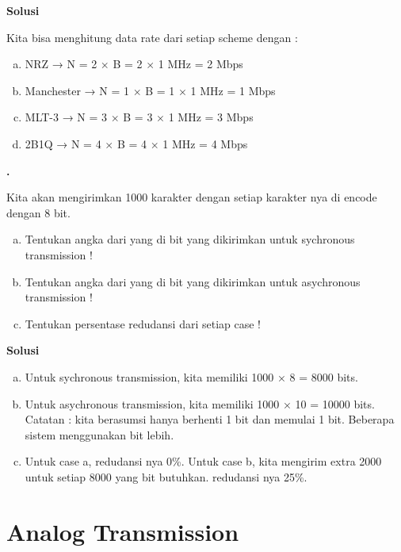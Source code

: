 \documentclass[oneside]{book}
\newcommand{\exercisename}{Latihan}
\newcommand{\solutionname}{Solusi}
\newcounter{exer}[chapter]
\renewcommand{\theexer}{\thechapter.\arabic{exer}}
\newenvironment{exercise}[1][]{
  \refstepcounter{exer}
  \par\noindent\textbf{\color{main}{\exercisename} \theexer #1 }\rmfamily}{
  \par\ignorespacesafterend}
\newenvironment{solution}{\par\noindent\textbf{\color{main}\solutionname} \em}{\par}
\begin{document}
\begin{solution}
  
  Kita bisa menghitung data rate dari setiap scheme dengan :
  \begin{enumerate}[a)]
    \item NRZ → N = 2 $\times$ B = 2 $\times$ 1 MHz = 2 Mbps
    \item Manchester → N = 1 $\times$ B = 1 $\times$ 1 MHz = 1 Mbps
    \item MLT-3 → N = 3 $\times$ B = 3 $\times$ 1 MHz = 3 Mbps
    \item 2B1Q → N = 4 $\times$ B = 4 $\times$ 1 MHz = 4 Mbps
  \end{enumerate}
\end{solution}

\vspace{12pt}

\begin{exercise}
  
  Kita akan mengirimkan 1000 karakter dengan setiap karakter nya di encode dengan 8 bit.
  \begin{enumerate}[a)]
    \item Tentukan angka dari yang di bit yang dikirimkan untuk sychronous transmission !
    \item Tentukan angka dari yang di bit yang dikirimkan untuk asychronous transmission !
    \item Tentukan persentase redudansi dari setiap case ! 
  \end{enumerate}
\end{exercise}

\begin{solution}
  \begin{enumerate}[a)]
    \item Untuk sychronous transmission, kita memiliki 1000 × 8 = 8000 bits.
    \item Untuk asychronous transmission, kita memiliki 1000 × 10 = 10000 bits. Catatan : kita berasumsi hanya berhenti 1 bit dan memulai 1 bit. Beberapa sistem menggunakan bit lebih.
    \item Untuk case a, redudansi nya 0\%. Untuk case b, kita mengirim extra 2000 untuk setiap 8000 yang bit butuhkan. redudansi nya 25\%.
  \end{enumerate}
\end{solution}

\chapter{Analog Transmission}
\end{document}
